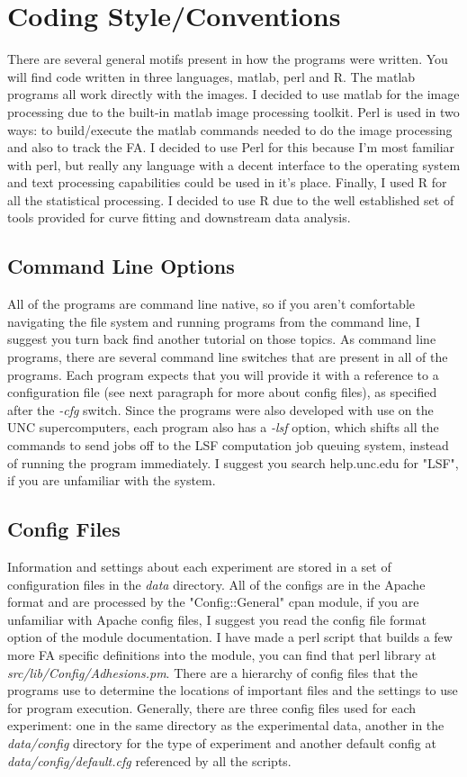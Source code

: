 \documentclass[letterpaper]{article}
\begin{document}
\section{Coding Style/Conventions}
	There are several general motifs present in how the programs were written. You
	will find code written in three languages, matlab, perl and R. The matlab
	programs all work directly with the images. I decided to use matlab for the
	image processing due to the built-in matlab image processing toolkit. Perl is
	used in two ways: to build/execute the matlab commands needed to do the image
	processing and also to track the FA. I decided to use Perl for this because I'm
	most familiar with perl, but really any language with a decent interface to the
	operating system and text processing capabilities could be used in it's place.
	Finally, I used R for all the statistical processing. I decided to use R due to
	the well established set of tools provided for curve fitting and
	downstream data analysis.

	\subsection{Command Line Options}

	All of the programs are command line native, so if you aren't comfortable
	navigating the file system and running programs from the command line, I suggest
	you turn back find another tutorial on those topics. As command line programs,
	there are several command line switches that are present in all of the
	programs. Each program expects that you will provide it with a reference to a
	configuration file (see next paragraph for more about config files), as
	specified after the \emph{-cfg} switch. Since the programs were also developed
	with use on the UNC supercomputers, each program also has a \emph{-lsf} option,
	which shifts all the commands to send jobs off to the LSF computation job
	queuing system, instead of running the program immediately. I suggest you search
	help.unc.edu for "LSF", if you are unfamiliar with the system.

	\subsection{Config Files}

	Information and settings about each experiment are stored in a set of
	configuration files in the \emph{data} directory. All of the configs are in the
	Apache format and are processed by the "Config::General" cpan module, if you are
	unfamiliar with Apache config files, I suggest you read the config file format
	option of the module documentation. I have made a perl script that builds a few
	more FA specific definitions into the module, you can find that perl library at
	\emph{src/lib/Config/Adhesions.pm}. There are a hierarchy of config files that
	the programs use to determine the locations of important files and the settings
	to use for program execution. Generally, there are three config files used for
	each experiment: one in the same directory as the experimental data, another in
	the \emph{data/config} directory for the type of experiment and another default
	config at \emph{data/config/default.cfg} referenced by all the scripts.
\end{document}
